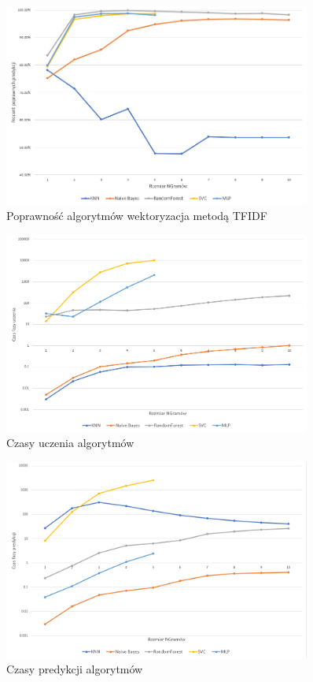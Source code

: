 \begin{figure}[h!]
    \centering
    \includegraphics[width=0.9\textwidth]{./Img/TFIDFAcc.png}
    \caption{Poprawność algorytmów wektoryzacja metodą TFIDF}
\end{figure}

\begin{figure}[h!]
    \centering
    \includegraphics[width=0.9\textwidth]{./Img/BOWLearn.png}
    \caption{Czasy uczenia algorytmów}
\end{figure}

\begin{figure}[h!]
    \centering
    \includegraphics[width=0.9\textwidth]{./Img/BOWPredict.png}
    \caption{Czasy predykcji algorytmów}
\end{figure}

